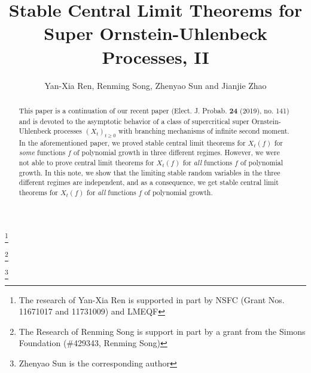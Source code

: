 \documentclass[12pt,a4paper]{amsart}
\theoremstyle{plain}
\theoremstyle{definition}
\numberwithin{equation}{section}
\begin{document}
\title
[stable CLT for super-OU processes, II]
{Stable Central Limit Theorems for Super Ornstein-Uhlenbeck Processes, II}
\author
[Y.-X. Ren, R. Song, Z. Sun and J. Zhao]
{Yan-Xia Ren, Renming Song, Zhenyao Sun and Jianjie Zhao}
\address{
  Yan-Xia Ren \\
  LMAM School of Mathematical Sciences \& Center for Statistical Science \\
  Peking University \\
  Beijing 100871, P. R. China}
\thanks{The research of Yan-Xia Ren is supported in part by NSFC (Grant Nos. 11671017  and 11731009) and LMEQF}
\address{
  Renming Song \\
  Department of Mathematics \\
  University of Illinois at Urbana-Champaign \\
  Urbana, IL 61801, USA}
\thanks{The Research of Renming Song is support in part by a grant from the Simons Foundation (\#429343, Renming Song)}
\address{
  Zhenyao Sun \\
  Faculty of Industrial Engineering and Management\\
  Technion, Israel Institute of Technology \\
  Haifa 3200003, Israel}
\thanks{Zhenyao Sun is the corresponding author}
\address{
  Jianjie Zhao \\
  School of Mathematical Sciences \\
  Peking University \\
  Beijing 100871, P. R. China}

\begin{abstract}
	This paper is a continuation of our recent paper (Elect. J. Probab. \textbf{24} (2019), no. 141) and is devoted to the asymptotic behavior of a class of supercritical super Ornstein-Uhlenbeck processes $(X_t)_{t\geq 0}$ with branching mechanisms of infinite second moment. In the aforementioned paper, we proved stable central limit theorems for  $X_t(f) $ for {\it some} functions $f$ of polynomial growth in three different regimes. However, we were not able to prove central limit theorems for $X_t(f) $ for {\it all} functions $f$ of polynomial growth. 
	In this note, we show that the limiting stable random variables in the three different regimes are independent, and as a consequence, we get stable central limit theorems for  $X_t(f) $ for {\it all} functions $f$ of polynomial growth. 
\end{abstract}
\maketitle
\end{document}
